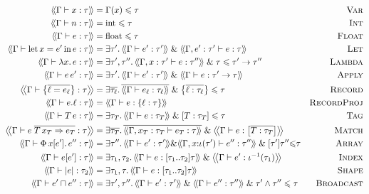 \begin{align*}
\cstr{\Gamma}{x}{\tau} &= \Gamma(x) \sub \tau 
&\textsc{Var} \\
\cstr{\Gamma}{n}{\tau} &= \sint \sub \tau
&\textsc{Int} \\
\cstr{\Gamma}{e}{\tau} &= \sfloat \sub \tau
&\textsc{Float} \\
\cstr{\Gamma}{\slet{x}{e'}{e}}{\tau} &= \exists \tau' \ldotp \cstr{\Gamma}{e'}{\tau'} \und \cstr{\Gamma, e' : \tau'}{e}{\tau}
&\textsc{Let} \\
\cstr{\Gamma}{\lambda x \ldotp e}{\tau} &= \exists \tau', \tau'' \ldotp \cstr{\Gamma, x : \tau'}{e}{\tau''} \und \tau \sub \tau' \to \tau''
&\textsc{Lambda} \\
\cstr{\Gamma}{e\,e'}{\tau} &= \exists \tau' \ldotp \cstr{\Gamma}{e'}{\tau'} \und \cstr{\Gamma}{e}{\tau' \to \tau}
&\textsc{Apply} \\
\cstr{\Gamma}{\srecordval{\overline{\ell = e_\ell}}}{\tau} &= \exists \overline{\tau_\ell} \ldotp \overline{\cstr{\Gamma}{e_\ell}{\tau_\ell}} \und \srecordtype{\overline{\ell : \tau_\ell}} \sub \tau
&\textsc{Record} \\
\cstr{\Gamma}{\sproj{e}{\ell}}{\tau} &= \cstr{\Gamma}{e}{\srecordtype{\ell : \tau}}
&\textsc{RecordProj} \\
\cstr{\Gamma}{T\,e}{\tau} &= \exists \tau_T \ldotp \cstr{\Gamma}{e}{\tau_T} \und \svarianttype{T : \tau_T} \sub \tau
&\textsc{Tag} \\
\cstr{\Gamma}{e\;\overline{T\,x_T \Rightarrow e_T}}{\tau} &= \exists \overline{\tau_T} \ldotp \overline{\cstr{\Gamma, x_T : \tau_T}{e_T}{\tau}} \und \cstr{\Gamma}{e}{\svarianttype{\overline{T : \tau_T}}}
&\textsc{Match} \\
\cstr{\Gamma}{\sbuild{x}{e'}{e''}}{\tau} &= \exists \tau'' \ldotp \cstr{\Gamma}{e'}{\tau'} {\undsym} \cstr{\Gamma, x {:} \iota(\tau')}{e''}{\tau''} \und \suniarraytype{\tau'}{\tau''} {\sub} \tau 
&\textsc{Array} \\
\cstr{\Gamma}{\sindex{e}{e'}}{\tau} &= \exists \tau_1, \tau_2 \ldotp \cstr{\Gamma}{e}{\sarraytype{\tau_1}{\tau_2}{\tau}} \und \cstr{\Gamma}{e'}{\iota^{-1}(\tau_1)}
&\textsc{Index} \\
\cstr{\Gamma}{\sshape e}{\tau_2} &= \exists \tau_1, \tau \ldotp \cstr{\Gamma}{e}{\sarraytype{\tau_1}{\tau_2}{\tau}}
&\textsc{Shape} \\
\cstr{\Gamma}{\sbroadcast{e'}{e''}}{\tau} &= \exists \tau', \tau'' \ldotp \cstr{\Gamma}{e'}{\tau'} \und \cstr{\Gamma}{e''}{\tau''} \und \tau' \meet \tau'' \sub \tau
&\textsc{Broadcast} \\

\end{align*}
